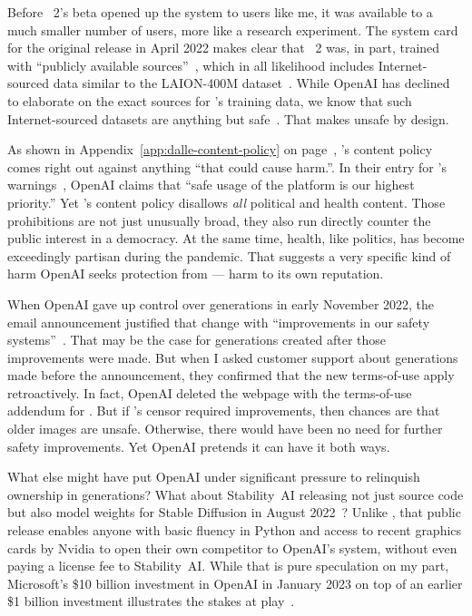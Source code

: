 Before \DALLE~2's beta opened up the system to users like me, it was available
to a much smaller number of users, more like a research experiment. The system
card~\cite{GreenProcopeea2022,ProcopeCheemaea2022} for the original release in
April 2022 makes clear that \DALLE~2 was, in part, trained with ``publicly
available sources''~\cite{MishkinAhmad2022}, which in all likelihood includes
Internet-sourced data similar to the LAION-400M
dataset~\cite{SchuhmannVencuea2021}. While OpenAI has declined to elaborate on
the exact sources for \DALLE's training data, we know that such Internet-sourced
datasets are anything but safe~\cite{BirhanePrabhuea2021}. That makes \DALLE{}
unsafe by design.

As shown in Appendix~\ref{app:dalle-content-policy} on
page~\pageref{app:dalle-content-policy}, \DALLE's content policy comes right out
against anything ``that could cause harm.''. In their \FAQ{} entry for \DALLE's
warnings~\cite{Natalie2022}, OpenAI claims that ``safe usage of the platform is
our highest priority.'' Yet \DALLE's content policy disallows \emph{all}
political and health content. Those prohibitions are not just unusually broad,
they also run directly counter the public interest in a democracy. At the same
time, health, like politics, has become exceedingly partisan during the
pandemic. That suggests a very specific kind of harm OpenAI seeks protection
from --- harm to its own reputation.

When OpenAI gave up control over generations in early November 2022, the email
announcement justified that change with ``improvements in our safety
systems''~\cite{OpenAI2022g}. That may be the case for generations created after
those improvements were made. But when I asked customer support about
generations made before the announcement, they confirmed that the new
terms-of-use apply retroactively. In fact, OpenAI deleted the webpage with the
terms-of-use addendum for \DALLE. But if \DALLE's censor required improvements,
then chances are that older images are unsafe. Otherwise, there would have been
no need for further safety improvements. Yet OpenAI pretends it can have it both
ways.

What else might have put OpenAI under significant pressure to relinquish
ownership in generations? What about Stability~AI releasing not just source code
but also model weights for Stable Diffusion in August
2022~\cite{StabilityAI2022}? Unlike \DALLE, that public release enables anyone
with basic fluency in Python and access to recent graphics cards by Nvidia to
open their own competitor to OpenAI's system, without even paying a license fee
to Stability~AI. While that is pure speculation on my part, Microsoft's \$10
billion investment in OpenAI in January 2023 on top of an earlier \$1 billion
investment illustrates the stakes at play~\cite{Bass2023}.

